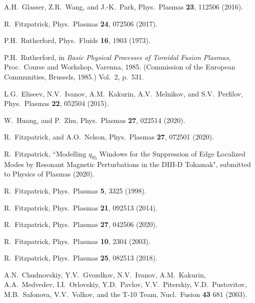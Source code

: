 \documentclass[12pt,prb,aps]{revtex4-1}
\begin{document}
\begin{thebibliography}{99}
 A.H.~Glasser, Z.R.~Wang, and J.-K.~Park, Phys.\ Plasmas {\bf 23}, 112506 (2016).

 R.~Fitzpatrick, Phys.\ Plasmas {\bf 24}, 072506 (2017). 

 P.H.~Rutherford,  Phys.\ Fluids  {\bf 16}, 1903 (1973).

 P.H.~Rutherford, in  {\it Basic Physical Processes of
Toroidal Fusion Plasmas}, Proc.\ Course and Workshop, Varenna, 1985. (Commission of the European Communities, Brussels, 1985.) Vol.~2, p.~531.

 L.G.~Eliseev, N.V.~Ivanov, A.M.~Kakurin, A.V.~Melnikov, and S.V.~Perfilov, Phys.\ Plasmas {\bf 22}, 052504 (2015). 

 W.~Huang, and P.~Zhu, Phys.\ Plasmas {\bf 27}, 022514 (2020).


 R.~Fitzpatrick, and A.O.~Nelson, Phys.\ Plasmas {\bf 27}, 072501 (2020).

 R.~Fitzpatrick,  ``Modelling $q_{95}$ Windows for the Suppression of Edge Localized
Modes by Resonant Magnetic Perturbations in the DIII-D Tokamak", submitted to Physics of Plasmas (2020).

 R.~Fitzpatrick, Phys.\ Plasmas {\bf 5}, 3325 (1998).

 R.~Fitzpatrick, Phys.\ Plasmas {\bf 21}, 092513 (2014).

 R.~Fitzpatrick, Phys.\ Plasmas {\bf 27}, 042506 (2020).

 R.~Fitzpatrick, Phys.\ Plasmas {\bf 10}, 2304 (2003).

 R.~Fitzpatrick, Phys.\ Plasmas {\bf 25}, 082513 (2018).			

 A.N.~Chudnovskiy, Y.V.~Gvozdkov, N.V.~Ivanov, A.M.~Kakurin,
A.A.~Medvedev, I.I.~Orlovskiy, Y.D.~Pavlov, V.V.~Piterskiy, V.D.~Pustovitov,
M.B.~Safonova, V.V.~Volkov, and the T-10 Team, Nucl.\ Fusion {\bf 43} 681 (2003).
\end{thebibliography}

\end{document}
